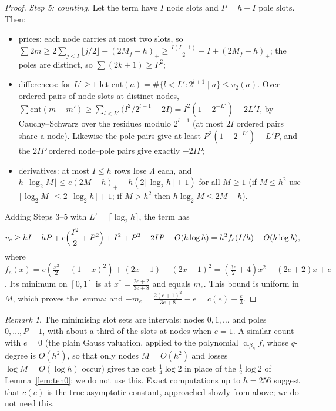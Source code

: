 \documentclass[11pt]{amsart}
\theoremstyle{definition}
\theoremstyle{remark}
\newtheorem{remark}[theorem]{Remark}
\numberwithin{equation}{section}
\newcommand{\cl}{\operatorname{cl}}
\begin{document}
\begin{proof}
\emph{Step 5: counting.} Let the term have $I$ node slots and $P=h-I$ pole slots. Then:
\begin{itemize}
\item prices: each node carries at most two slots, so $\sum2m\ge2\sum_{j<I}\lfloor j/2\rfloor+(2M_f-h)_+\ge\frac{I(I-1)}2-I+(2M_f-h)_+$;
  the poles are distinct, so $\sum(2k+1)\ge P^2$;
\item differences: for $L'\ge1$ let $\mathrm{cnt}(a)=\#\{l<L':2^{l+1}\mid a\}\le v_2(a)$. Over ordered pairs of node slots
  at distinct nodes, $\sum\mathrm{cnt}(m-m')\ge\sum_{l<L'}\bigl(I^2/2^{l+1}-2I\bigr)=I^2(1-2^{-L'})-2L'I$, by
  Cauchy--Schwarz over the residues modulo $2^{l+1}$ (at most $2I$ ordered pairs share a node). Likewise the pole pairs
  give at least $P^2(1-2^{-L'})-L'P$, and the $2IP$ ordered node--pole pairs give exactly $-2IP$;
\item derivatives: at most $I\le h$ rows lose $\Lambda$ each, and
  $h\lfloor\log_2M\rfloor\le e(2M-h)_++h(2\lfloor\log_2h\rfloor+1)$ for all $M\ge1$ (if $M\le h^2$ use
  $\lfloor\log_2M\rfloor\le2\lfloor\log_2h\rfloor+1$; if $M>h^2$ then $h\log_2M\le2M-h$).
\end{itemize}
Adding Steps 3--5 with $L'=\lceil\log_2h\rceil$, the term has
\[
  v_e\ge hI-hP+e\Bigl(\frac{I^2}2+P^2\Bigr)+I^2+P^2-2IP-O(h\log h)=h^2f_e(I/h)-O(h\log h),
\]
where $f_e(x)=e(\frac{x^2}2+(1-x)^2)+(2x-1)+(2x-1)^2=(\frac{3e}2+4)x^2-(2e+2)x+e$. Its minimum on $[0,1]$ is at
$x^*=\frac{2e+2}{3e+8}$ and equals $m_e$. This bound is uniform in $M$, which proves the lemma; and
$-m_e=\frac{2(e+1)^2}{3e+8}-e=c(e)-\frac e3$.
\end{proof}

\begin{remark}
The minimising slot sets are intervals: nodes $0,1,\dots$ and poles $0,\dots,P-1$, with about a third of the slots at
nodes when $e=1$. A similar count with $e=0$ (the plain Gauss valuation, applied to the polynomial
$\cl_{\beta_h}f$, whose $q$-degree is $O(h^2)$, so that only nodes $M=O(h^2)$ and losses $\log M=O(\log h)$ occur)
gives the cost $\frac14\log2$ in place of the $\frac12\log2$ of Lemma~\ref{lem:ten0}; we do not use this. Exact computations up to $h=256$ suggest that $c(e)$ is the true
asymptotic constant, approached slowly from above; we do not need this.
\end{remark}
\end{document}

